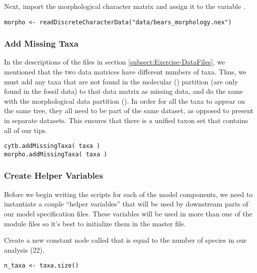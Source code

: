 Next, import the morphological character matrix and assign it to the variable . 
{\tt \begin{snugshade*}
\begin{lstlisting}
morpho <- readDiscreteCharacterData("data/bears_morphology.nex")
\end{lstlisting}
\end{snugshade*}}

 

\medskip
\subsubsection{Add Missing Taxa}\label{subsub:Exercise-AddMissing}

In the descriptions of the files in section \ref{subsect:Exercise-DataFiles}, we mentioned that the two data matrices have different numbers of taxa. 
Thus, we must add any taxa that are not found in the molecular () partition (\IE are only found in the fossil data) to that data matrix as missing data, and do the same with the morphological data partition ().
In order for all the taxa to appear on the same tree, they all need to be part of the same dataset, as opposed to present in separate datasets. 
This ensures that there is a unified taxon set that contains all of our tips.
{\tt \begin{snugshade*}
\begin{lstlisting}
cytb.addMissingTaxa( taxa )
morpho.addMissingTaxa( taxa )
\end{lstlisting}
\end{snugshade*}}


\medskip
\subsubsection{Create Helper Variables}\label{subsub:Exercise-mviVar}

Before we begin writing the \Rev scripts for each of the model components, we need to instantiate a couple ``helper variables'' that will be used by downstream parts of our model specification files. 
These variables will be used in more than one of the module files so it's best to initialize them in the master file.

Create a new constant node called  that is equal to the number of species in our analysis (22). 
{\tt \begin{snugshade*}
\begin{lstlisting}
n_taxa <- taxa.size() 
\end{lstlisting}
\end{snugshade*}}

